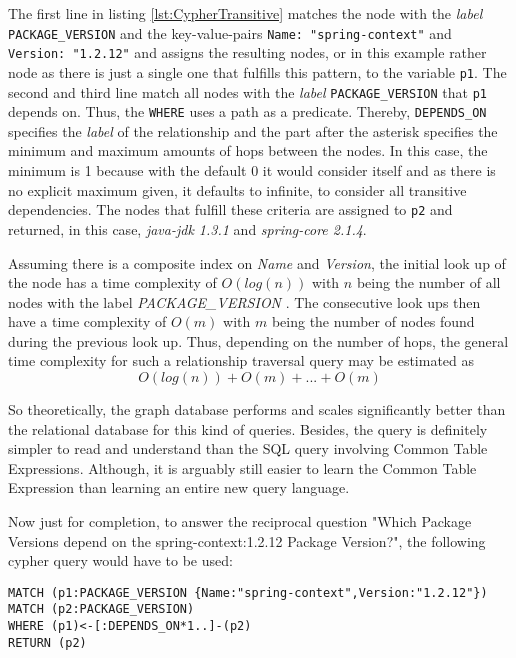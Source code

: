 The first line in listing \ref{lst:CypherTransitive} matches the node with the \emph{label} \lstinline|PACKAGE_VERSION| and the key-value-pairs \lstinline|Name: "spring-context"| and \lstinline|Version: "1.2.12"| and assigns the resulting nodes, or in this example rather node as there is just a single one that fulfills this pattern, to the variable \lstinline|p1|. The second and third line match all nodes with the \emph{label} \lstinline|PACKAGE_VERSION| that \lstinline|p1| depends on. Thus, the \lstinline|WHERE| uses a path as a predicate. Thereby, \lstinline|DEPENDS_ON| specifies the \emph{label} of the relationship and the part after the asterisk specifies the minimum and maximum amounts of hops between the nodes. In this case, the minimum is 1 because with the default 0 it would consider itself and as there is no explicit maximum given, it defaults to infinite, to consider all transitive dependencies. The nodes that fulfill these criteria are assigned to \lstinline|p2| and returned, in this case, \emph{java-jdk 1.3.1} and \emph{spring-core 2.1.4}.\par 
Assuming there is a composite index on \emph{Name} and \emph{Version}, the initial look up of the node has a time complexity of $O(log(n))$ with $n$ being the number of all nodes with the label \emph{PACKAGE\_VERSION} \cite{neo4j}. The consecutive look ups then have a time complexity of $O(m)$ with $m$ being the number of nodes found during the previous look up. Thus, depending on the number of hops, the general time complexity for such a relationship traversal query may be estimated as 
$$O(log(n)) + O(m) + ... + O(m)$$

So theoretically, the graph database performs and scales significantly better than the relational database for this kind of queries. Besides, the query is definitely simpler to read and understand than the SQL query involving Common Table Expressions. Although, it is arguably still easier to learn the Common Table Expression than learning an entire new query language.\par 
Now just for completion, to answer the reciprocal question "Which Package Versions depend on the spring-context:1.2.12 Package Version?", the following cypher query would have to be used:

\begin{lstlisting}[caption=Package Version Reciprocal Dependencies (including transitive), captionpos=b, label=lst:CypherReciprocalTransitive]
MATCH (p1:PACKAGE_VERSION {Name:"spring-context",Version:"1.2.12"})
MATCH (p2:PACKAGE_VERSION)
WHERE (p1)<-[:DEPENDS_ON*1..]-(p2)
RETURN (p2)
\end{lstlisting}

